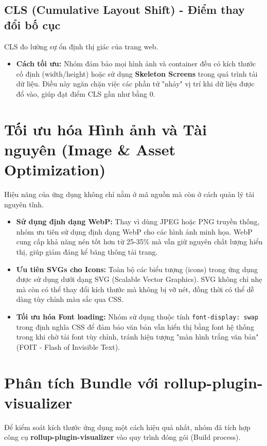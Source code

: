 \subsection{CLS (Cumulative Layout Shift) - Điểm thay đổi bố cục}
CLS đo lường sự ổn định thị giác của trang web.
\begin{itemize}
    \item \textbf{Cách tối ưu:} Nhóm đảm bảo mọi hình ảnh và container đều có kích thước cố định (width/height) hoặc sử dụng \textbf{Skeleton Screens} trong quá trình tải dữ liệu. Điều này ngăn chặn việc các phần tử "nhảy" vị trí khi dữ liệu được đổ vào, giúp đạt điểm CLS gần như bằng 0.
\end{itemize}

\section{Tối ưu hóa Hình ảnh và Tài nguyên (Image \& Asset Optimization)}
Hiệu năng của ứng dụng không chỉ nằm ở mã nguồn mà còn ở cách quản lý tài nguyên tĩnh.

\begin{itemize}
    \item \textbf{Sử dụng định dạng WebP:} Thay vì dùng JPEG hoặc PNG truyền thống, nhóm ưu tiên sử dụng định dạng WebP cho các hình ảnh minh họa. WebP cung cấp khả năng nén tốt hơn từ 25-35\% mà vẫn giữ nguyên chất lượng hiển thị, giúp giảm đáng kể băng thông tải trang.
    \item \textbf{Ưu tiên SVGs cho Icons:} Toàn bộ các biểu tượng (icons) trong ứng dụng được sử dụng dưới dạng SVG (Scalable Vector Graphics). SVG không chỉ nhẹ mà còn có thể thay đổi kích thước mà không bị vỡ nét, đồng thời có thể dễ dàng tùy chỉnh màu sắc qua CSS.
    \item \textbf{Tối ưu hóa Font loading:} Nhóm sử dụng thuộc tính \texttt{font-display: swap} trong định nghĩa CSS để đảm bảo văn bản vẫn hiển thị bằng font hệ thống trong khi chờ tải font tùy chỉnh, tránh hiện tượng "màn hình trắng văn bản" (FOIT - Flash of Invisible Text).
\end{itemize}

\section{Phân tích Bundle với rollup-plugin-visualizer}
Để kiểm soát kích thước ứng dụng một cách hiệu quả nhất, nhóm đã tích hợp công cụ \textbf{rollup-plugin-visualizer} vào quy trình đóng gói (Build process).

